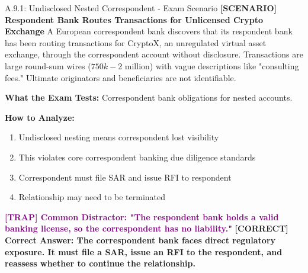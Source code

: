 \documentclass[11pt,a4paper]{beamer}
\newcommand{\trap}[1]{\textcolor{purple}{\textbf{[TRAP] #1}}}
\newcommand{\correct}[1]{\textcolor{green!50!black}{\textbf{[CORRECT] #1}}}
\newcommand{\scenario}[1]{\textcolor{blue!70!black}{\textbf{[SCENARIO] #1}}}
\begin{document}
	\begin{frame}{A.9.1: Undisclosed Nested Correspondent - Exam Scenario}
		\scenario{Respondent Bank Routes Transactions for Unlicensed Crypto Exchange}
		A European correspondent bank discovers that its respondent bank has been routing transactions for CryptoX, an unregulated virtual asset exchange, through the correspondent account without disclosure. Transactions are large round-sum wires ($750k-$2 million) with vague descriptions like "consulting fees." Ultimate originators and beneficiaries are not identifiable.
		
		\vspace{0.1cm}
		\textbf{What the Exam Tests:} Correspondent bank obligations for nested accounts.
		
		\vspace{0.1cm}
		\textbf{How to Analyze:}
		\begin{enumerate}
			\item Undisclosed nesting means correspondent lost visibility
			\item This violates core correspondent banking due diligence standards
			\item Correspondent must file SAR and issue RFI to respondent
			\item Relationship may need to be terminated
		\end{enumerate}
		
		\trap{Common Distractor: "The respondent bank holds a valid banking license, so the correspondent has no liability."}
		\correct{Correct Answer: The correspondent bank faces direct regulatory exposure. It must file a SAR, issue an RFI to the respondent, and reassess whether to continue the relationship.}
	\end{frame}
	
\end{document}
